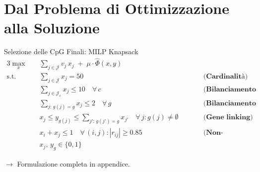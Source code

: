 \documentclass{beamer}
\begin{document}
\section{Dal Problema di Ottimizzazione alla Soluzione}


\begin{frame}{Selezione delle CpG Finali: MILP Knapsack}
{\scriptsize
\begin{alignat*}{3}
\max_{x} \quad
& \sum_{j \in \mathcal{J}} v_j\, x_j \;+\; \mu \cdot \hat{\Phi}(x, y) & & \\[6pt]
\text{s.t.} \quad
& \sum_{j \in \mathcal{J}} x_j = 50
  &\qquad& \textbf{(Cardinalità)} \\[4pt]
& \sum_{j \in \mathcal{J}_c} x_j \leq 10 \quad \forall\, c
  &\qquad& \textbf{(Bilanciamento cromosomico)} \\[4pt]
& \sum_{j:\,g(j)=g} x_j \leq 2 \quad \forall\, g
  &\qquad& \textbf{(Bilanciamento genico)} \\[4pt]
& x_j \leq y_{g(j)} \leq \textstyle\sum_{j':\,g(j')=g} x_{j'} \quad \forall\, j : g(j) \neq \emptyset
  &\qquad& \textbf{(Gene linking)} \\[4pt]
& x_i + x_j \leq 1 \quad \forall\,(i,j):|r_{ij}|\geq 0.85
  &\qquad& \textbf{(Non-ridondanza)} \\[4pt]
& x_j,\, y_g \in \{0,1\}
\end{alignat*}
}

\hfill{\scriptsize $\rightarrow$ Formulazione completa in appendice.}

\end{frame}
\end{document}
